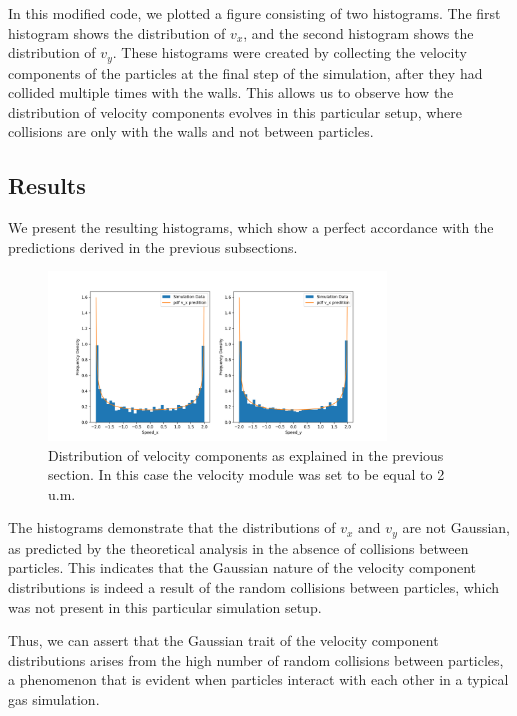 \documentclass{article}
\begin{document}
In this modified code, we plotted a figure consisting of two histograms. The first histogram shows the distribution of \(v_x\), and the second histogram shows the distribution of \(v_y\). These histograms were created by collecting the velocity components of the particles at the final step of the simulation, after they had collided multiple times with the walls. This allows us to observe how the distribution of velocity components evolves in this particular setup, where collisions are only with the walls and not between particles.

\subsection{Results}
We present the resulting histograms, which show a perfect accordance with the predictions derived in the previous subsections.
\begin{figure}[h] %
    \centering
    \includegraphics[width=0.8\textwidth]{vel_components.png} %
    \caption{Distribution of velocity components as explained in the previous section. In this case the velocity module was set to be equal to 2 u.m.}
    \label{fig:velocity_distribution} %
\end{figure}

The histograms demonstrate that the distributions of \( v_x \) and \( v_y \) are not Gaussian, as predicted by the theoretical analysis in the absence of collisions between particles. This indicates that the Gaussian nature of the velocity component distributions is indeed a result of the random collisions between particles, which was not present in this particular simulation setup.

Thus, we can assert that the Gaussian trait of the velocity component distributions arises from the high number of random collisions between particles, a phenomenon that is evident when particles interact with each other in a typical gas simulation.
\end{document}
